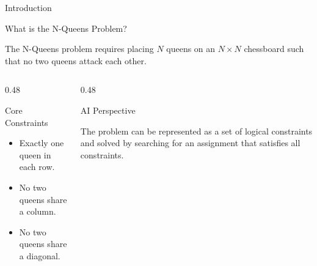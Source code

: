 \documentclass[aspectratio=169,12pt]{beamer}
\begin{document}

\begin{frame}{Introduction}

\begin{block}{What is the N-Queens Problem?}

The N-Queens problem requires placing $N$ queens on an
$N \times N$ chessboard such that no two queens attack
each other.
\end{block}

\begin{columns}[T,totalwidth=\textwidth]

\begin{column}{0.48\textwidth}

\begin{block}{Core Constraints}

\begin{itemize}
    \item Exactly one queen in each row.
    \item No two queens share a column.
    \item No two queens share a diagonal.
\end{itemize}

\end{block}

\end{column}

\begin{column}{0.48\textwidth}

\begin{exampleblock}{AI Perspective}

The problem can be represented as a set of logical
constraints and solved by searching for an assignment
that satisfies all constraints.
\end{exampleblock}

\end{column}

\end{columns}

\end{frame}

\end{document}

